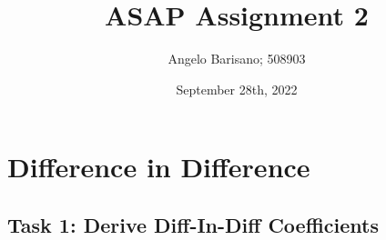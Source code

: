 \documentclass[a4paper]{article}
\begin{document}
\title{ASAP Assignment 2}
\author{Angelo Barisano; 508903 }
\date{September 28th, 2022}
\maketitle

\newpage


\section{Difference in Difference}






\subsection{Task 1: Derive Diff-In-Diff Coefficients}
\end{document}
